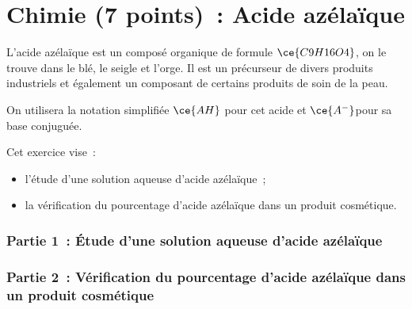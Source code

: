 \part{Chimie (7 points)~: Acide azélaïque}
L'acide azélaïque est un composé organique de formule $\ce{C9H16O4}$, on le
trouve dans le blé, le seigle et l'orge. Il est un précurseur de divers produits
industriels et également un composant de certains produits de soin de la peau.

On utilisera la notation simplifiée $\ce{AH}$ pour cet acide et $\ce{A^{-}}$pour
sa base conjuguée.

Cet exercice vise~:
\begin{itemize}
    \item l'étude d'une solution aqueuse d'acide azélaïque~;
    \item la vérification du pourcentage d'acide azélaïque dans un produit
          cosmétique.
\end{itemize}

\section*{Partie 1~: Étude d'une solution aqueuse d'acide azélaïque}


\section*{Partie 2~: Vérification du pourcentage d'acide azélaïque dans un produit cosmétique}



